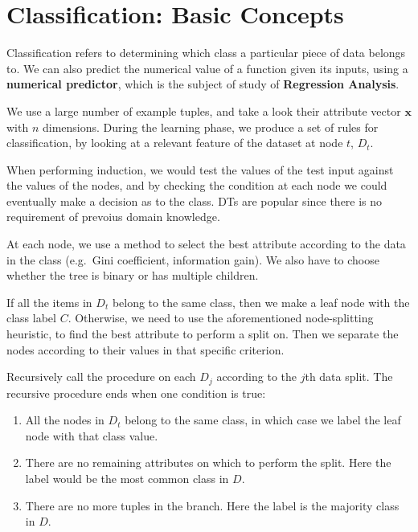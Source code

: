 \documentclass[
  paper=a4,
,captions=tableheading
]{scrartcl}
\date{}
\title{}
\author{}
\providecommand{\tightlist}{%
  \setlength{\itemsep}{0pt}\setlength{\parskip}{0pt}}
\begin{document}




\hypertarget{classification-basic-concepts}{%
\section{Classification: Basic
Concepts}\label{classification-basic-concepts}}

Classification refers to determining which class a particular piece of
data belongs to. We can also predict the numerical value of a function
given its inputs, using a \textbf{numerical predictor}, which is the
subject of study of \textbf{Regression Analysis}.

We use a large number of example tuples, and take a look their attribute
vector \(\mathbf{x}\) with \(n\) dimensions. During the learning phase,
we produce a set of rules for classification, by looking at a relevant
feature of the dataset at node \(t\), \(D_{t}\).

When performing induction, we would test the values of the test input
against the values of the nodes, and by checking the condition at each
node we could eventually make a decision as to the class. DTs are
popular since there is no requirement of prevoius domain knowledge.

At each node, we use a method to select the best attribute according to
the data in the class (e.g.~Gini coefficient, information gain). We also
have to choose whether the tree is binary or has multiple children.

If all the items in \(D_{t}\) belong to the same class, then we make a
leaf node with the class label \(C\). Otherwise, we need to use the
aforementioned node-splitting heuristic, to find the best attribute to
perform a split on. Then we separate the nodes according to their values
in that specific criterion.

Recursively call the procedure on each \(D_{j}\) according to the
\(j\)th data split. The recursive procedure ends when one condition is
true:

\begin{enumerate}
\def\labelenumi{\arabic{enumi}.}
\tightlist
\item
  All the nodes in \(D_{t}\) belong to the same class, in which case we
  label the leaf node with that class value.
\item
  There are no remaining attributes on which to perform the split. Here
  the label would be the most common class in \(D\).
\item
  There are no more tuples in the branch. Here the label is the majority
  class in \(D\).
\end{enumerate}
\end{document}
